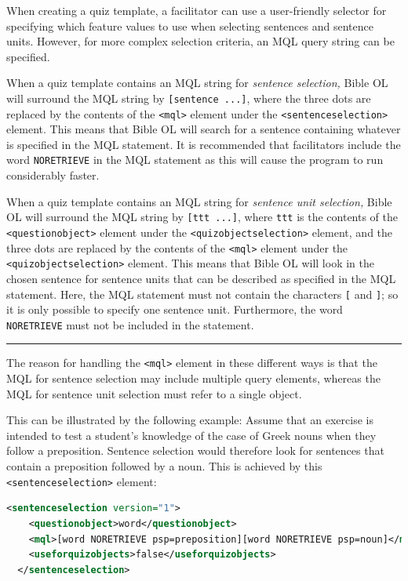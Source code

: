 \documentclass[11pt,oneside,a4paper]{memoir}
\newcommand*{\xml}[1]{\texttt{<#1>}}
\begin{document}
When creating a quiz template, a facilitator can use a user-friendly selector for specifying which
feature values to use when selecting sentences and sentence units. However, for more complex
selection criteria, an MQL query string can be specified.

When a quiz template contains an MQL string for \emph{sentence selection,} Bible OL will surround
the MQL string by \texttt{[sentence ...]}, where the three dots are replaced by the contents of the
\xml{mql} element under the \xml{sentenceselection} element. This means that Bible OL will search
for a sentence containing whatever is specified in the MQL statement. It is recommended that
facilitators include the word \texttt{NORETRIEVE} in the MQL statement as this
will cause the program to run considerably faster.

When a quiz template contains an MQL string for \emph{sentence unit selection,}
Bible OL will surround the MQL string by \texttt{[ttt ...]}, where \texttt{ttt} is the contents of
the \xml{questionobject} element under the \xml{quizobjectselection} element, and the three dots are
replaced by the contents of the \xml{mql} element under the \xml{quizobjectselection} element. This
means that Bible OL will look in the chosen sentence for sentence units that can be described as
specified in the MQL statement. Here, the MQL statement must not contain the characters \texttt{[}
  and \texttt{]}; so it is only possible to specify one sentence unit. Furthermore, the word
\texttt{NORETRIEVE} must not be included in the statement.

\pfbreak

The reason for handling the \xml{mql} element in these different ways is that the MQL for sentence
selection may include multiple query elements, whereas the MQL for sentence unit selection must
refer to a single object.

This can be illustrated by the following example: Assume that an exercise is intended to test a
student's knowledge of the case of Greek nouns when they follow a preposition. Sentence selection
would therefore look for sentences that contain a preposition followed by a noun. This is achieved
by this \xml{sentenceselection}\index{sentenceselection@\xml{sentenceselection}} element:

\begin{lstlisting}[language=XML]
  <sentenceselection version="1">
    <questionobject>word</questionobject>
    <mql>[word NORETRIEVE psp=preposition][word NORETRIEVE psp=noun]</mql>
    <useforquizobjects>false</useforquizobjects>
  </sentenceselection>
\end{lstlisting}
\end{document}

